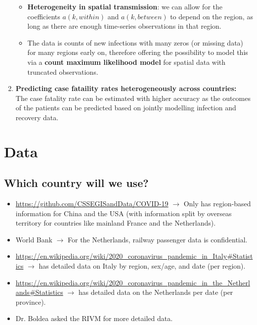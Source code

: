 \documentclass{article}
\begin{document}
\begin{enumerate}
\begin{itemize}
            \item \textbf{Heterogeneity in spatial transmission}: we can allow for the coefficients $a(k, within)$ and $a(k, between)$ to depend on the region, as long as there are enough time-series observations in that region.
            \item The data is counts of new infections with many zeros (or missing data) for many regions early on, therefore offering the possibility to model this via a \textbf{count maximum likelihood model} for spatial data with truncated observations.
        \end{itemize}
    \item \textbf{Predicting case fataility rates heterogeneously across countries:}\\
    The case fatality rate can be estimated with higher accuracy as the outcomes of the patients can be predicted based on jointly modelling infection and recovery  data. 
\end{enumerate}

\section{Data}
\subsection{Which country will we use?}
\begin{itemize}
    \item \href{https://github.com/CSSEGISandData/COVID-19}{https://github.com/CSSEGISandData/COVID-19} $\xrightarrow{}$ Only has region-based information for China and the USA (with information split by overseas territory for countries like mainland France and the Netherlands).
    \item World Bank $\xrightarrow{}$ For the Netherlands, railway passenger data is confidential.
    \item \href{https://en.wikipedia.org/wiki/2020_coronavirus_pandemic_in_Italy#Statistics}{https://en.wikipedia.org/wiki/2020\_coronavirus\_pandemic\_in\_Italy\#Statistics} $\xrightarrow{}$ has detailed data on Italy by region, sex/age, and date (per region).
    \item \href{https://en.wikipedia.org/wiki/2020_coronavirus_pandemic_in_the_Netherlands#Statistics}{https://en.wikipedia.org/wiki/2020\_coronavirus\_pandemic\_in\_the\_Netherlands\#Statistics} $\xrightarrow{}$ has detailed data on the Netherlands per date (per province).
    \item Dr. Boldea asked the RIVM for more detailed data.
\end{itemize}
\end{document}
